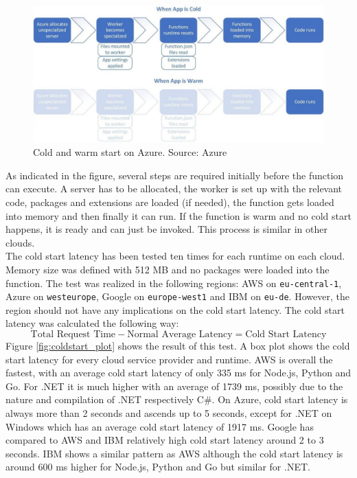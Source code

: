 \begin{figure}[htp]
\begin{center}
\includegraphics[scale=0.51]{bilder/azure-coldstart.jpeg}
\captionsetup{justification=centering, labelfont=bf}
\caption[Cold and warm start on Azure]{Cold and warm start on Azure. Source: Azure \cite{AzureColdStart}}
\label{fig:azure_coldstart}
\end{center}
\end{figure}
As indicated in the figure, several steps are required initially before the function can execute. A server has to be allocated, the worker is set up with the relevant code, packages and extensions are loaded (if needed), the function gets loaded into memory and then finally it can run. If the function is warm and no cold start happens, it is ready and can just be invoked. This process is similar in other clouds.\\
The cold start latency has been tested ten times for each runtime on each cloud. Memory size was defined with 512 \gls{MB} and no packages were loaded into the function. The test was realized in the following regions: \gls{AWS} on \texttt{eu-central-1}, Azure on \texttt{westeurope}, Google on \texttt{europe-west1} and \gls{IBM} on \texttt{eu-de}. However, the region should not have any implications on the cold start latency. The cold start latency was calculated the following way:
$$\text{Total Request Time} - \text{Normal Average Latency} = \text{Cold Start Latency}$$
Figure \ref{fig:coldstart_plot} shows the result of this test. 
A box plot shows the cold start latency for every cloud service provider and runtime. \gls{AWS} is overall the fastest, with an average cold start latency of only 335 ms for Node.js, Python and Go. For .NET it is much higher with an average of 1739 ms, possibly due to the nature and compilation of .NET respectively C\#. On Azure, cold start latency is always more than 2 seconds and ascends up to 5 seconds, except for .NET on Windows which has an average cold start latency of 1917 ms. Google has compared to \gls{AWS} and \gls{IBM} relatively high cold start latency around 2 to 3 seconds. \gls{IBM} shows a similar pattern as \gls{AWS} although the cold start latency is around 600 ms higher for Node.js, Python and Go but similar for .NET.

